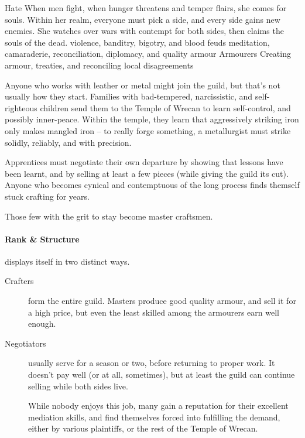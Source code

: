 \begin{multicols}{2}
  {Hate}%
  {When men fight, when hunger threatens and temper flairs, she comes for souls.
  Within her realm, everyone must pick a side, and every side gains new enemies.
  She watches over wars with contempt for both sides, then claims the souls of the dead.}%
  {violence, banditry, bigotry, and blood feuds}%
  {meditation, camaraderie, reconciliation, diplomacy, and quality armour}%
  {Armourers}%
  {Creating armour, treaties, and reconciling local disagreements}%

Anyone who works with leather or metal might join the guild, but that's not usually how they start.
Families with bad-tempered, narcissistic, and self-righteous children send them to the Temple of Wrecan to learn self-control, and possibly inner-peace.
Within the temple, they learn that aggressively striking iron only makes mangled iron -- to really forge something, a metallurgist must strike solidly, reliably, and with precision.

Apprentices must negotiate their own departure by showing that lessons have been learnt, and by selling at least a few pieces (while giving the guild its cut).
Anyone who becomes cynical and contemptuous of the long process finds themself stuck crafting for years.

Those few with the grit to stay become master craftsmen.

\paragraph{Rank \& Structure}
displays itself in two distinct ways.

\begin{description}
  \item[Crafters]
  form the entire guild.
  Masters produce good quality armour, and sell it for a high price, but even the least skilled among the armourers earn well enough.
  \item[Negotiators]
  usually serve for a season or two, before returning to proper work.
  It doesn't pay well (or at all, sometimes), but at least the guild can continue selling while both sides live.

  While nobody enjoys this job, many gain a reputation for their excellent mediation skills, and find themselves forced into fulfilling the demand, either by various plaintiffs, or the rest of the Temple of Wrecan.
\end{description}


\end{multicols}

